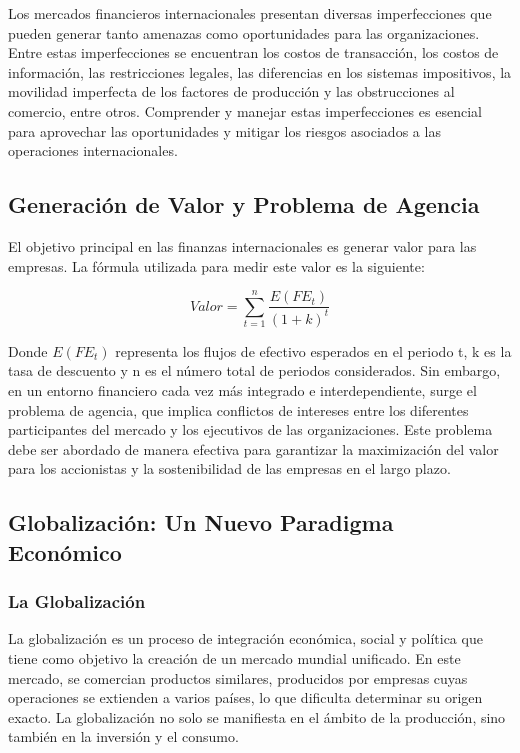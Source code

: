 \documentclass[
  a4paper,
]{article}
\begin{document}
Los mercados financieros internacionales presentan diversas
imperfecciones que pueden generar tanto amenazas como oportunidades para
las organizaciones. Entre estas imperfecciones se encuentran los costos
de transacción, los costos de información, las restricciones legales,
las diferencias en los sistemas impositivos, la movilidad imperfecta de
los factores de producción y las obstrucciones al comercio, entre otros.
Comprender y manejar estas imperfecciones es esencial para aprovechar
las oportunidades y mitigar los riesgos asociados a las operaciones
internacionales.

\subsection{Generación de Valor y Problema de
Agencia}\label{generaciuxf3n-de-valor-y-problema-de-agencia}

El objetivo principal en las finanzas internacionales es generar valor
para las empresas. La fórmula utilizada para medir este valor es la
siguiente:

\[
Valor = \sum_{t=1}^{n} \frac{E(FE_t)}{(1+k)^t}
\]

Donde \(E(FE_t)\) representa los flujos de efectivo esperados en el
periodo t, k es la tasa de descuento y n es el número total de periodos
considerados. Sin embargo, en un entorno financiero cada vez más
integrado e interdependiente, surge el problema de agencia, que implica
conflictos de intereses entre los diferentes participantes del mercado y
los ejecutivos de las organizaciones. Este problema debe ser abordado de
manera efectiva para garantizar la maximización del valor para los
accionistas y la sostenibilidad de las empresas en el largo plazo.

\subsection{Globalización: Un Nuevo Paradigma
Económico}\label{globalizaciuxf3n-un-nuevo-paradigma-econuxf3mico}

\subsubsection{La Globalización}\label{la-globalizaciuxf3n}

La globalización es un proceso de integración económica, social y
política que tiene como objetivo la creación de un mercado mundial
unificado. En este mercado, se comercian productos similares, producidos
por empresas cuyas operaciones se extienden a varios países, lo que
dificulta determinar su origen exacto. La globalización no solo se
manifiesta en el ámbito de la producción, sino también en la inversión y
el consumo.
\end{document}
